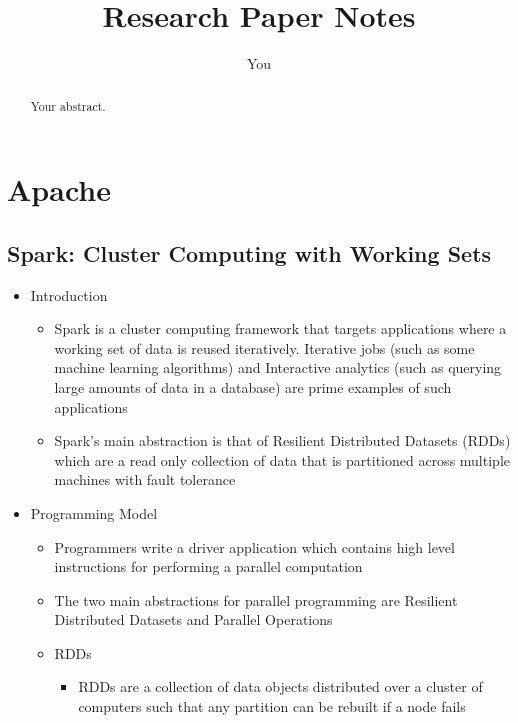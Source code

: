\documentclass[a4paper]{article}
\title{Research Paper Notes}
\author{You}
\begin{document}
\maketitle

\begin{abstract}
Your abstract.
\end{abstract}

\section{Apache}

\subsection{Spark: Cluster Computing with Working Sets}

\begin{itemize}

\item Introduction
\begin{itemize}
\item Spark is a cluster computing framework that targets applications where a working set of data is reused iteratively. Iterative jobs (such as some machine learning algorithms) and Interactive analytics (such as querying large amounts of data in a database) are prime examples of such applications

\item Spark's main abstraction is that of Resilient Distributed Datasets (RDDs) which are a read only collection of data that is partitioned across multiple machines with fault tolerance
\end{itemize}

\item Programming Model
\begin{itemize}

\item Programmers write a driver application which contains high level instructions for performing a parallel computation

\item The two main abstractions for parallel programming are Resilient Distributed Datasets and Parallel Operations

\item RDDs
\begin{itemize}
\item RDDs are a collection of data objects distributed over a cluster of computers such that any partition can be rebuilt if a node fails


\end{itemize}
\end{itemize}
\end{itemize}
\end{document}
